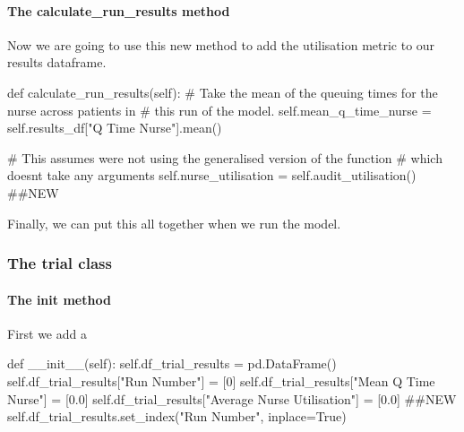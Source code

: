 \documentclass[
  letterpaper,
  DIV=11,
  numbers=noendperiod]{scrreprt}
\let\oldparagraph\paragraph
\renewcommand{\paragraph}[1]{\oldparagraph{#1}\mbox{}}
\newenvironment{Shaded}{}{}
\newcommand{\CommentTok}[1]{\textcolor[rgb]{0.42,0.45,0.49}{#1}}
\newcommand{\DecValTok}[1]{\textcolor[rgb]{0.00,0.36,0.77}{#1}}
\newcommand{\FloatTok}[1]{\textcolor[rgb]{0.00,0.36,0.77}{#1}}
\newcommand{\FunctionTok}[1]{\textcolor[rgb]{0.44,0.26,0.76}{#1}}
\newcommand{\KeywordTok}[1]{\textcolor[rgb]{0.84,0.23,0.29}{#1}}
\newcommand{\NormalTok}[1]{\textcolor[rgb]{0.14,0.16,0.18}{#1}}
\newcommand{\OperatorTok}[1]{\textcolor[rgb]{0.14,0.16,0.18}{#1}}
\newcommand{\StringTok}[1]{\textcolor[rgb]{0.01,0.18,0.38}{#1}}
\newcommand{\VariableTok}[1]{\textcolor[rgb]{0.89,0.38,0.04}{#1}}
\begin{document}
\paragraph{The calculate\_run\_results
method}\label{the-calculate_run_results-method-4}

Now we are going to use this new method to add the utilisation metric to
our results dataframe.

\begin{Shaded}
\begin{Highlighting}[]
\KeywordTok{def}\NormalTok{ calculate\_run\_results(}\VariableTok{self}\NormalTok{):}
    \CommentTok{\# Take the mean of the queuing times for the nurse across patients in}
    \CommentTok{\# this run of the model.}
    \VariableTok{self}\NormalTok{.mean\_q\_time\_nurse }\OperatorTok{=} \VariableTok{self}\NormalTok{.results\_df[}\StringTok{"Q Time Nurse"}\NormalTok{].mean()}

    \CommentTok{\# This assumes we\textquotesingle{}re not using the generalised version of the function}
    \CommentTok{\# which doesn\textquotesingle{}t take any arguments}
    \VariableTok{self}\NormalTok{.nurse\_utilisation }\OperatorTok{=} \VariableTok{self}\NormalTok{.audit\_utilisation() }\CommentTok{\#\#NEW}
\end{Highlighting}
\end{Shaded}

Finally, we can put this all together when we run the model.

\subsubsection{The trial class}\label{the-trial-class-7}

\paragraph{\texorpdfstring{The \textbf{init}
method}{The init method}}\label{the-init-method-7}

First we add a

\begin{Shaded}
\begin{Highlighting}[]
\KeywordTok{def}  \FunctionTok{\_\_init\_\_}\NormalTok{(}\VariableTok{self}\NormalTok{):}
    \VariableTok{self}\NormalTok{.df\_trial\_results }\OperatorTok{=}\NormalTok{ pd.DataFrame()}
    \VariableTok{self}\NormalTok{.df\_trial\_results[}\StringTok{"Run Number"}\NormalTok{] }\OperatorTok{=}\NormalTok{ [}\DecValTok{0}\NormalTok{]}
    \VariableTok{self}\NormalTok{.df\_trial\_results[}\StringTok{"Mean Q Time Nurse"}\NormalTok{] }\OperatorTok{=}\NormalTok{ [}\FloatTok{0.0}\NormalTok{]}
    \VariableTok{self}\NormalTok{.df\_trial\_results[}\StringTok{"Average Nurse Utilisation"}\NormalTok{] }\OperatorTok{=}\NormalTok{ [}\FloatTok{0.0}\NormalTok{] }\CommentTok{\#\#NEW}
    \VariableTok{self}\NormalTok{.df\_trial\_results.set\_index(}\StringTok{"Run Number"}\NormalTok{, inplace}\OperatorTok{=}\VariableTok{True}\NormalTok{)}
\end{Highlighting}
\end{Shaded}
\end{document}
